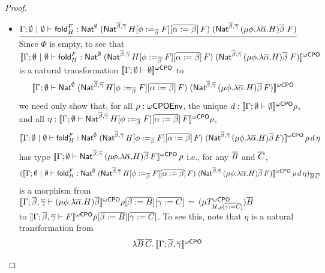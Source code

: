 \documentclass[acmsmall,review,anonymous]{acmart}
\theoremstyle{definition}
\begin{document}
\begin{proof}
\begin{itemize}
\item
$\underline{\Gamma; \emptyset~|~\emptyset \vdash \mathsf{fold}^F_H :
  \mathsf{Nat}^\emptyset\;(\mathsf{Nat}^{\overline{\beta}, \overline{\gamma}}\,H[\phi
    :=_{\overline{\beta}} F][\overline{\alpha := \beta}]\,F)\;
  (\mathsf{Nat}^{{\overline{\beta},\overline{\gamma}} }\,(\mu \phi.\lambda \overline
  \alpha.H)\overline \beta \;F)}$ \; Since $\Phi$ is empty, to see
  that $\llbracket{ \Gamma; \emptyset~|~\emptyset \vdash \mathsf{fold}^F_H :
    \mathsf{Nat}^\emptyset\;(\mathsf{Nat}^{\overline{\beta}, \overline{\gamma}}\,H[\phi
      :=_{\overline{\beta}} F][\overline{\alpha := \beta}]\,F)\;
    (\mathsf{Nat}^{{\overline{\beta},\overline{\gamma}} }\,(\mu \phi.\lambda \overline
    \alpha.H)\overline \beta \;F)}\rrbracket^{{\omega\mathsf{CPO}}}$ is a natural transformation
  $\llbracket{\Gamma;\emptyset \vdash \emptyset}\rrbracket^{{\omega\mathsf{CPO}}}$ to \[\llbracket{\Gamma;
    \emptyset \vdash \mathsf{Nat}^\emptyset\;(\mathsf{Nat}^{\overline{\beta},
      \overline{\gamma}}\,H[\phi :=_{\overline{\beta}} F][\overline{\alpha :=
        \beta}]\,F)\; (\mathsf{Nat}^{{\overline{\beta},\overline{\gamma}} }\,(\mu
    \phi.\lambda \overline \alpha.H)\overline \beta\,F)}\rrbracket^{{\omega\mathsf{CPO}}}\] we need only
  show that, for all $\rho : \omega\mathsf{CPOEnv}$, the unique $d :
  \llbracket{\Gamma;\emptyset \vdash \emptyset}\rrbracket^{{\omega\mathsf{CPO}}} \rho$, and all $\eta :
  \llbracket{\Gamma; \emptyset \vdash \mathsf{Nat}^{\overline{\beta},
      \overline{\gamma}}\,H[\phi :=_{\overline{\beta}} F][\overline{\alpha :=
        \beta}]\,F}\rrbracket^{{\omega\mathsf{CPO}}} \rho$,
\[ \llbracket{\Gamma; \emptyset~|~\emptyset \vdash \mathsf{fold}^F_H :
  \mathsf{Nat}^\emptyset\;(\mathsf{Nat}^{\overline{\beta}, \overline{\gamma}}\,H[\phi
    :=_{\overline{\beta}} F][\overline{\alpha := \beta}]\,F)\;
  (\mathsf{Nat}^{{\overline{\beta},\overline{\gamma}} }\,(\mu \phi.\lambda \overline
  \alpha.H)\overline \beta\,F)}\rrbracket^{{\omega\mathsf{CPO}}}\,\rho\,d\,\eta\] has type
$\llbracket{\Gamma; \emptyset \vdash \mathsf{Nat}^{{\overline{\beta},\overline{\gamma}}
  }\,(\mu \phi.\lambda \overline \alpha.H)\overline \beta\,F}\rrbracket^{{\omega\mathsf{CPO}}}\,\rho$
i.e., for any $\overline{B}$ and $\overline{C}$,
\[(\llbracket{\Gamma; \emptyset~|~\emptyset \vdash \mathsf{fold}^F_H :
  \mathsf{Nat}^\emptyset\;(\mathsf{Nat}^{\overline{\beta}, \overline{\gamma}}\,H[\phi
    :=_{\overline{\beta}} F][\overline{\alpha := \beta}]\,F)\;
  (\mathsf{Nat}^{{\overline{\beta},\overline{\gamma}} }\,(\mu \phi.\lambda \overline
  \alpha.H)\overline \beta\,F)}\rrbracket^{{\omega\mathsf{CPO}}}\,\rho\,d\,\eta)_{\overline{B}\,\overline{C}}\] is a
morphism from $\llbracket{\Gamma; \overline{\beta},\overline{\gamma} \vdash (\mu
  \phi.\lambda \overline \alpha.H)\overline \beta}\rrbracket^{{\omega\mathsf{CPO}}}\rho[\overline{\beta :=
    B}][\overline{\gamma := C}] \,=\,(\mu T^{\omega\mathsf{CPO}}_{H,\rho[\overline{\gamma := C}]})
\overline{B}$\\ to $\llbracket{\Gamma; \overline{\beta},\overline{\gamma} \vdash
  F}\rrbracket^{{\omega\mathsf{CPO}}}\rho[\overline{\beta := B}][\overline{\gamma := C}]$.  To see this, note
that $\eta$ is a natural transformation from
\[\begin{array}{ll}
 & \lambda \overline{B}\,\overline{C}.\,\llbracket{\Gamma; \overline{\beta},\overline{\gamma}
}\rrbracket^{{\omega\mathsf{CPO}}}
\end{array}\]
\end{itemize}
\end{proof}
\end{document}

